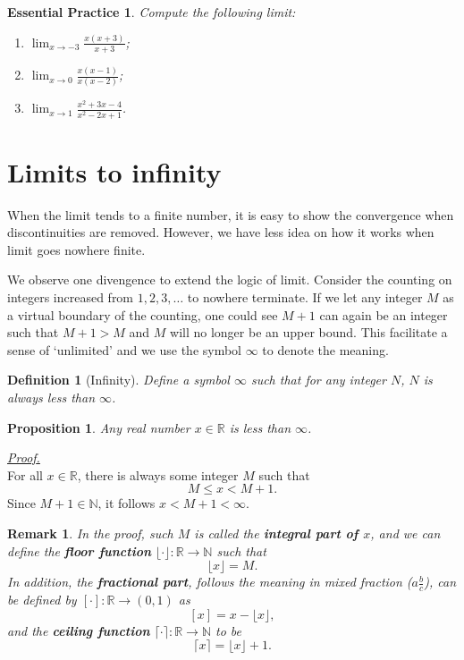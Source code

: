 \documentclass[12pt]{article}
\newtheorem{definition}{Definition}[section]
\newtheorem*{proposition}{Proposition}
\newtheorem*{remark}{Remark}
\newtheorem{exercise}{Essential Practice}[section]
\renewenvironment{proof}[1][Proof]{\begin{snugshade*} \underline{\textit{{#1}.}}\\}{\hfill \qedsymbol \end{snugshade*}}
\begin{document}
    \begin{exercise}
        Compute the following limit:
        \begin{enumerate}
            \item $\displaystyle \lim_{x\to -3}\frac{x(x+3)}{x+3}$;
            \item $\displaystyle \lim_{x\to 0}\frac{x(x-1)}{x(x-2)}$;
            \item $\displaystyle \lim_{x\to 1}\frac{x^2+3x-4}{x^2-2x+1}$.
        \end{enumerate}
    \end{exercise}

    \section{Limits to infinity}

    When the limit tends to a finite number, it is easy to show the convergence when discontinuities are removed. However, we have less idea on how it works when limit goes nowhere finite.
    
    We observe one divengence to extend the logic of limit. Consider the counting on integers increased from $1,2,3,\dots$ to nowhere terminate. If we let any integer $M$ as a virtual boundary of the counting, one could see $M+1$ can again be an integer such that $M+1>M$ and $M$ will no longer be an upper bound. This facilitate a sense of `unlimited' and we use the symbol $\infty$ to denote the meaning.

    \begin{definition}[Infinity]
        Define a symbol $\infty$ such that for any integer $N$, $N$ is always less than $\infty$.
    \end{definition}

    \begin{proposition}
        Any real number $x\in\mathbb{R}$ is less than $\infty$.
    \end{proposition}

    \begin{proof}
        For all $x\in \mathbb{R}$, there is always some integer $M$ such that \[M\leq x< M+1.\] Since $M+1\in\mathbb{N}$, it follows $x<M+1<\infty$.
    \end{proof}

    \begin{remark}
        In the proof, such $M$ is called the \textbf{integral part of $x$}, and we can define the \textbf{floor function} $\lfloor \cdot \rfloor:\mathbb{R}\to\mathbb{N}$ such that \[\lfloor x \rfloor = M.\] In addition, the \textbf{fractional part}, follows the meaning in mixed fraction ($a\frac{b}{c}$), can be defined by $[\cdot]:\mathbb{R}\to (0,1)$ as \[[x]=x-\lfloor x \rfloor,\] and the \textbf{ceiling function} $\lceil \cdot \rceil:\mathbb{R}\to\mathbb{N}$ to be \[\lceil x \rceil=\lfloor x \rfloor + 1.\]
    \end{remark}
\end{document}
